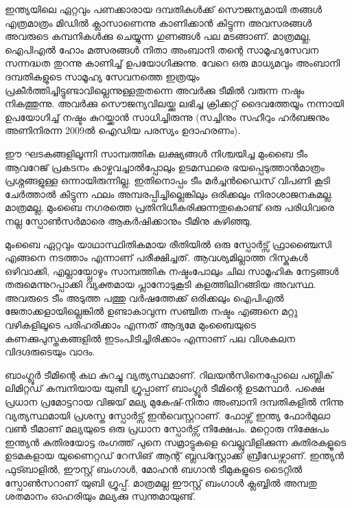 ഇന്ത്യയിലെ ഏറ്റവും പണക്കാരായ ദമ്പതികള്‍ക്ക് സൌജന്യമായി തങ്ങള്‍ എത്രമാത്രം മിഡില്‍ ക്ലാസാണെന്നു 
കാണിക്കാന്‍ കിട്ടുന്ന അവസരങ്ങള്‍ അവരുടെ കമ്പനികള്‍ക്കു ചെയ്യുന്ന ഗുണങ്ങള്‍ പല മടങ്ങാണ്. മാത്രമല്ല, 
ഐപിഎല്‍ ഹോം മത്സരങ്ങള്‍ നിതാ അംബാനി തന്റെ സാമൂഹ്യസേവന സന്നദ്ധത തുറന്നു കാണിച്ച് ഉപയോഗിക്കുന്നു. 
വേറെ ഒരു മാധ്യമവും അംബാനി ദമ്പതികളുടെ സാമൂഹ്യ സേവനത്തെ ഇത്രയും പ്രകീര്‍ത്തിച്ചിട്ടുണ്ടാവില്ലെന്നുള്ളതുതന്നെ 
അവര്‍ക്കു ടീമില്‍ വരുന്ന നഷ്ടം നികത്തുന്നു. അവര്‍ക്കു സൌജന്യവിലയ്ക്കു ലഭിച്ച ക്രിക്കറ്റ് ദൈവത്തേയൂം നന്നായി ഉപയോഗിച്ച് 
നഷ്ടം കുറയ്ക്കാന്‍ സാധിച്ചിരുന്നു (സച്ചിനും സഹീറും ഹര്‍ബജനും അണിനിരന്ന 2009ല്‍ ഐഡിയ പരസ്യം ഉദാഹരണം).

ഈ ഘടകങ്ങളിലൂന്നി സാമ്പത്തിക ലക്ഷ്യങ്ങള്‍ നിശ്ചയിച്ച മുംബൈ ടീം ആവറേജ് പ്രകടനം കാഴ്ചവച്ചാല്‍പ്പോലും ഉടമസ്ഥരെ 
ഭയപ്പെടുത്താന്‍മാത്രം പ്രശ്നങ്ങളുള്ള ഒന്നായിരുന്നില്ല. ഇതിനൊപ്പം ടീം മര്‍ച്ചന്‍ഡൈസ് വിപണി കൂടി ചേര്‍ത്താല്‍ കിട്ടുന്ന 
ഫലം അമ്പരപ്പിച്ചില്ലെങ്കിലും ഒരിക്കലും നിരാശാജനകമല്ല. മാത്രമല്ല, മുംബൈ നഗരത്തെ പ്രതിനിധീകരിക്കുന്നതുകൊണ്ട് ഒരു 
പരിധിവരെ നല്ല സ്പോണ്‍സര്‍മാരെ ആകര്‍ഷിക്കാനും ടീമിനു കഴിഞ്ഞു.

മുംബൈ ഏറ്റവും യാഥാസ്ഥിതികമായ രീതിയില്‍ ഒരു സ്പോര്‍ട്സ് ഫ്രാഞ്ചൈസി എങ്ങനെ നടത്താം എന്നാണ് പരീക്ഷിച്ചത്. 
ആവശ്യമില്ലാത്ത റിസ്കുകള്‍ ഒഴിവാക്കി, എല്ലായ്പ്പോഴും സാമ്പത്തിക നഷ്ടംപോലും ചില സാമൂഹിക നേട്ടങ്ങള്‍ തരുമെന്നുറപ്പാക്കി 
വ്യക്തമായ പ്ലാനോടുകൂടി കളത്തിലിറങ്ങിയ അവസ്ഥ. അവരുടെ ടീം അടുത്ത പത്തു വര്‍ഷത്തേക്ക് ഒരിക്കലും ഐപിഎല്‍ 
ജേതാക്കളായില്ലെങ്കില്‍ ഉണ്ടാകാവുന്ന സഞ്ചിത നഷ്ടം എങ്ങനെ മറ്റു വഴികളിലൂടെ പരിഹരിക്കാം എന്നത് ആദ്യമേ മുംബൈയുടെ 
കണക്കുപുസ്തകങ്ങളില്‍ ഇടംപിടിച്ചിരിക്കാം എന്നാണ് പല വിശകലന വിദഗ്ദരുടെയും വാദം.

ബാംഗ്ലൂര്‍ ടീമിന്റെ കഥ കുറച്ചു വ്യത്യസ്ഥമാണ്. റിലയന്‍സിനെപ്പോലെ പബ്ലിക് ലിമിറ്റഡ് കമ്പനിയായ യുബി ഗ്രൂപ്പാണ് 
ബാംഗ്ലൂര്‍ ടീമിന്റെ ഉടമസ്ഥര്‍. പക്ഷെ പ്രധാന പ്രമോട്ടറായ വിജയ് മല്യ മുകേഷ്-നിതാ അംബാനി ദമ്പതികളില്‍ നിന്നു 
വ്യത്യസ്ഥമായി പ്രശസ്ത സ്പോര്‍ട്സ് ഇന്‍വെസ്റ്ററാണ്. ഫോഴ്സ് ഇന്ത്യ ഫോര്‍മുലാ വണ്‍ ടീമാണ് മല്യയുടെ ഒരു പ്രധാന 
സ്പോര്‍ട്സ് നിക്ഷേപം. മറ്റൊരു നിക്ഷേപം ഇന്ത്യന്‍ കുതിരയോട്ട രംഗത്ത് പുനെ സമ്രാട്ടുകളെ വെല്ലുവിളിക്കുന്ന കുതിരകളൂടെ 
ഉടമകളായ യുണൈറ്റഡ് റേസിങ് ആന്റ് ബ്ലഡ്സ്റ്റോക്ക് ബ്രീഡേഴ്സാണ്. ഇന്ത്യന്‍ ഫുട്ബാളില്‍, ഈസ്റ്റ് ബംഗാള്‍, 
മോഹന്‍ ബഗാന്‍ ടീമുകളുടെ ടൈറ്റില്‍ സ്പോണ്‍സറാണ് യുബി ഗ്രൂപ്പ്. മാത്രമല്ല ഈസ്റ്റ് ബംഗാള്‍ ക്ലബ്ബില്‍ അമ്പതു 
ശതമാനം ഓഹരിയും മല്യക്കു സ്വന്തമായുണ്ട്.


